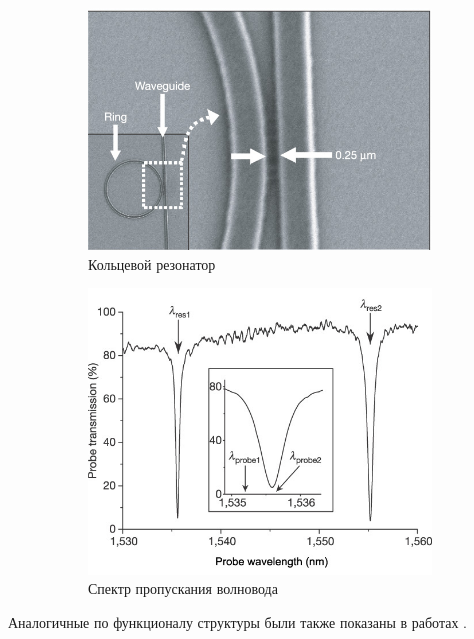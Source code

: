 \begin{figure}[h]
	\begin{subfigure}[b]{.53\textwidth}
		\centering
		\includegraphics[width=.9\textwidth]{img/ring}
		\caption{Кольцевой резонатор}
		\label{fig:ring}
	\end{subfigure}
	\begin{subfigure}[b]{.47\textwidth}
		\centering
		\includegraphics[width=.9\textwidth]{img/ring_spectrum}
		\caption{Спектр пропускания волновода}
		\label{fig:ring_spectrum}
	\end{subfigure}
	\caption{}
\end{figure}

Аналогичные по функционалу структуры были также показаны в работах \cite{Kippenberg2004, Gondarenko2009, Pollinger2009, Soltani2007}.